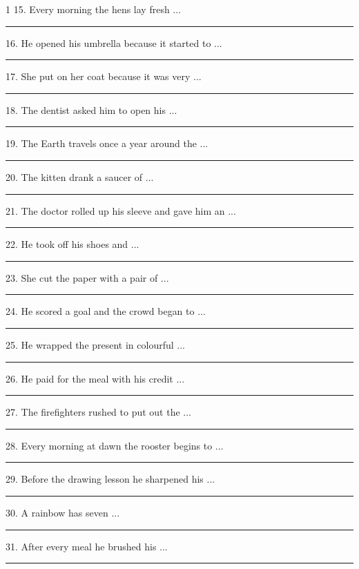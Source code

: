 \documentclass[11pt,a4paper]{article}
\newcommand{\blank}[1][1.2cm]{\rule{#1}{0.4pt}}
\begin{document}
\begin{multicols}{1}
15. Every morning the hens lay fresh ...\hfill\blank[3cm]\par\vspace{3pt}
16. He opened his umbrella because it started to ...\hfill\blank[3cm]\par\vspace{3pt}
17. She put on her coat because it was very ...\hfill\blank[3cm]\par\vspace{3pt}
18. The dentist asked him to open his ...\hfill\blank[3cm]\par\vspace{3pt}
19. The Earth travels once a year around the ...\hfill\blank[3cm]\par\vspace{3pt}
20. The kitten drank a saucer of ...\hfill\blank[3cm]\par\vspace{3pt}
21. The doctor rolled up his sleeve and gave him an ...\hfill\blank[3cm]\par\vspace{3pt}
22. He took off his shoes and ...\hfill\blank[3cm]\par\vspace{3pt}
23. She cut the paper with a pair of ...\hfill\blank[3cm]\par\vspace{3pt}
24. He scored a goal and the crowd began to ...\hfill\blank[3cm]\par\vspace{3pt}
25. He wrapped the present in colourful ...\hfill\blank[3cm]\par\vspace{3pt}
26. He paid for the meal with his credit ...\hfill\blank[3cm]\par\vspace{3pt}
27. The firefighters rushed to put out the ...\hfill\blank[3cm]\par\vspace{3pt}
28. Every morning at dawn the rooster begins to ...\hfill\blank[3cm]\par\vspace{3pt}
29. Before the drawing lesson he sharpened his ...\hfill\blank[3cm]\par\vspace{3pt}
30. A rainbow has seven ...\hfill\blank[3cm]\par\vspace{3pt}
31. After every meal he brushed his ...\hfill\blank[3cm]\par\vspace{3pt}

\end{multicols}
\end{document}
